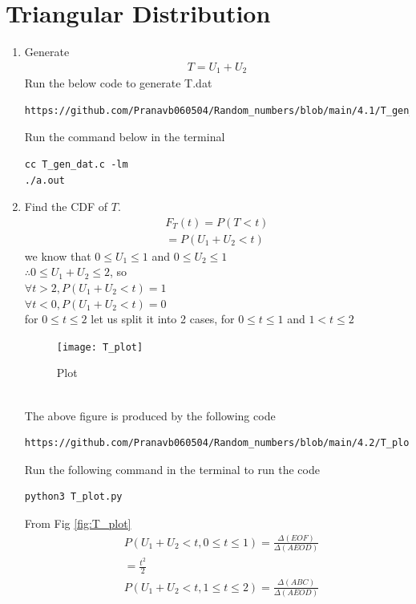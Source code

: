 \documentclass[journal,12pt,twocolumn]{IEEEtran}
\renewcommand\thesection{\arabic{section}}
\begin{document}
\section{Triangular Distribution}
\begin{enumerate}[label=\thesection.\arabic*
,ref=\thesection.\theenumi]
%
\item Generate 
	\begin{align}
		T = U_1+U_2
	\end{align}
\solution 
Run the below code to generate T.dat
\begin{lstlisting}
https://github.com/Pranavb060504/Random_numbers/blob/main/4.1/T_gen_dat.c
\end{lstlisting}
Run the command below in the terminal 
\begin{lstlisting}
cc T_gen_dat.c -lm
./a.out
\end{lstlisting}
\item Find the CDF of $T$.
\begin{align}
F_{T}(t)=P(T<t)
\\=P(U_1 +U_2 <t)
\end{align}
we know that $0\leq U_1 \leq 1$ and $0\leq U_2 \leq 1$\\
$\therefore 0\leq U_1 + U_2 \leq 2$, so\\
 $\forall t>2, P(U_1 +U_2 <t)=1$\\
 $\forall t<0, P(U_1 +U_2 <t)=0$\\
   for $0\leq t \leq 2$ let us split it into 2 cases, for $0 \leq t\leq 1$ and $1 <t \leq2$\\
    \begin{figure}[h]
\texttt{[image: T\_plot]}
\caption{Plot}
\label{fig:T_plot}
\end{figure}
\\
The above figure is produced by the following code
\begin{lstlisting}
https://github.com/Pranavb060504/Random_numbers/blob/main/4.2/T_plot.py
\end{lstlisting}
Run the following command in the terminal to run the code
\begin{lstlisting}
python3 T_plot.py
\end{lstlisting}
From Fig \eqref{fig:T_plot}
\begin{align}
&P(U_1+U_2<t, 0\leq t \leq 1)=\frac{ \Delta(EOF)}{\Delta(AEOD)}\\
&=\frac{t^2}{2}\\
&P(U_1+U_2<t, 1\leq t \leq 2)=\frac{\Delta(ABC)}{\Delta(AEOD)}\\

\end{align}
\end{enumerate}
\end{document}
